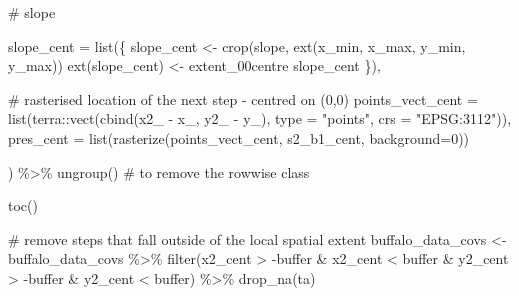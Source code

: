 \documentclass[
  letterpaper,
  DIV=11,
  numbers=noendperiod]{scrartcl}
\newenvironment{Shaded}{\begin{snugshade}}{\end{snugshade}}
\newcommand{\AttributeTok}[1]{\textcolor[rgb]{0.40,0.45,0.13}{#1}}
\newcommand{\CommentTok}[1]{\textcolor[rgb]{0.37,0.37,0.37}{#1}}
\newcommand{\DecValTok}[1]{\textcolor[rgb]{0.68,0.00,0.00}{#1}}
\newcommand{\FunctionTok}[1]{\textcolor[rgb]{0.28,0.35,0.67}{#1}}
\newcommand{\NormalTok}[1]{\textcolor[rgb]{0.00,0.23,0.31}{#1}}
\newcommand{\OtherTok}[1]{\textcolor[rgb]{0.00,0.23,0.31}{#1}}
\newcommand{\SpecialCharTok}[1]{\textcolor[rgb]{0.37,0.37,0.37}{#1}}
\newcommand{\StringTok}[1]{\textcolor[rgb]{0.13,0.47,0.30}{#1}}
\begin{document}
\begin{Shaded}
\begin{Highlighting}[]
    \CommentTok{\# slope}

    \AttributeTok{slope\_cent =} \FunctionTok{list}\NormalTok{(\{}
\NormalTok{      slope\_cent }\OtherTok{\textless{}{-}} \FunctionTok{crop}\NormalTok{(slope, }\FunctionTok{ext}\NormalTok{(x\_min, x\_max, y\_min, y\_max))}
      \FunctionTok{ext}\NormalTok{(slope\_cent) }\OtherTok{\textless{}{-}}\NormalTok{ extent\_00centre}
\NormalTok{      slope\_cent}
\NormalTok{      \}),}

    \CommentTok{\# rasterised location of the next step {-} centred on (0,0)}
    \AttributeTok{points\_vect\_cent =} \FunctionTok{list}\NormalTok{(terra}\SpecialCharTok{::}\FunctionTok{vect}\NormalTok{(}\FunctionTok{cbind}\NormalTok{(x2\_ }\SpecialCharTok{{-}}\NormalTok{ x\_, y2\_ }\SpecialCharTok{{-}}\NormalTok{ y\_), }\AttributeTok{type =} \StringTok{"points"}\NormalTok{, }\AttributeTok{crs =} \StringTok{"EPSG:3112"}\NormalTok{)),}
    \AttributeTok{pres\_cent =} \FunctionTok{list}\NormalTok{(}\FunctionTok{rasterize}\NormalTok{(points\_vect\_cent, s2\_b1\_cent, }\AttributeTok{background=}\DecValTok{0}\NormalTok{))}

\NormalTok{  ) }\SpecialCharTok{\%\textgreater{}\%} \FunctionTok{ungroup}\NormalTok{() }\CommentTok{\# to remove the \textquotesingle{}rowwise\textquotesingle{} class}


  \FunctionTok{toc}\NormalTok{()}

  \CommentTok{\# remove steps that fall outside of the local spatial extent}
\NormalTok{  buffalo\_data\_covs }\OtherTok{\textless{}{-}}\NormalTok{ buffalo\_data\_covs }\SpecialCharTok{\%\textgreater{}\%}
    \FunctionTok{filter}\NormalTok{(x2\_cent }\SpecialCharTok{\textgreater{}} \SpecialCharTok{{-}}\NormalTok{buffer }\SpecialCharTok{\&}\NormalTok{ x2\_cent }\SpecialCharTok{\textless{}}\NormalTok{ buffer }\SpecialCharTok{\&}\NormalTok{ y2\_cent }\SpecialCharTok{\textgreater{}} \SpecialCharTok{{-}}\NormalTok{buffer }\SpecialCharTok{\&}\NormalTok{ y2\_cent }\SpecialCharTok{\textless{}}\NormalTok{ buffer) }\SpecialCharTok{\%\textgreater{}\%}
    \FunctionTok{drop\_na}\NormalTok{(ta)}



\end{Highlighting}
\end{Shaded}
\end{document}
